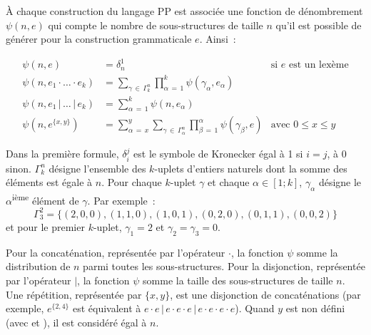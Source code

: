 À chaque construction du langage PP est associée une fonction de dénombrement
$\psi(n, e)$ qui compte le nombre de sous-structures de taille $n$ qu'il est
possible de générer pour la construction grammaticale $e$. Ainsi~:

\begin{align*}
%
\psi(n, e) & =
    \delta_n^1
    &
    \text{si $e$ est un lexème}
    \\
%
\psi(n, e_1 \cdot \dotso \cdot e_k) & =
    \sum_{\gamma \,\in\, \Gamma_k^n}
    \prod_{\alpha \,=\, 1}^k
    \psi(\gamma_\alpha, e_\alpha)
    \\
%
\psi(n, e_1 \,\vert\, \dots \,\vert\, e_k) & =
    \sum_{\alpha \,=\, 1}^k
    \psi(n, e_\alpha)
    \\
%
\psi(n, e^{\{x, y\}}) & =
    \sum_{\alpha \,=\, x}^y
    \sum_{\gamma \,\in\, \Gamma_\alpha^n}
    \prod_{\beta \,=\, 1}^\alpha
    \psi(\gamma_\beta, e)
    &
    \text{avec $0 \leq x \leq y$}
%
\end{align*}

Dans la première formule, $\delta_i^j$ est le symbole de Kronecker égal à 1 si
$i = j$, à 0 sinon. $\Gamma_k^n$ désigne l'ensemble des $k$-uplets d'entiers
naturels dont la somme des éléments est égale à $n$. Pour chaque $k$-uplet
$\gamma$ et chaque $\alpha \in [1; k]$, $\gamma_\alpha$ désigne le
$\alpha$\textsuperscript{ième} élément de $\gamma$.
%
Par exemple~:
%
$$\Gamma_3^2 = \{(2, 0, 0), (1, 1, 0), (1, 0, 1), (0, 2, 0), (0, 1, 1), (0, 0,
2)\}$$
%
et pour le premier $k$-uplet, $\gamma_1 = 2$ et $\gamma_2 = \gamma_3 = 0$.

Pour la concaténation, représentée par l'opérateur $\cdot$, la fonction $\psi$
somme la distribution de $n$ parmi toutes les sous-structures. Pour la
disjonction, représentée par l'opérateur $\vert$, la fonction $\psi$ somme la
taille des sous-structures de taille $n$. Une répétition, représentée par $\{x,
y\}$, est une disjonction de concaténations (par exemple, $e^{\{2,4\}}$ est
équivalent à $e \cdot e \,\vert\, e \cdot e \cdot e \,\vert\, e \cdot e \cdot e
\cdot e$). Quand $y$ est non défini (avec \code{*} et \code{+}), il est
considéré égal à $n$.

